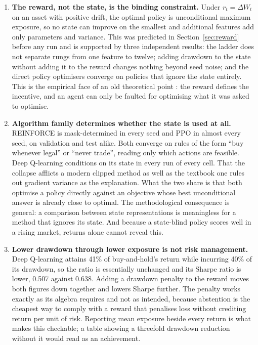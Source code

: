 \begin{enumerate}
  \item \textbf{The reward, not the state, is the binding constraint.}
  Under $r_t = \Delta W_t$ on an asset with positive drift, the optimal
  policy is unconditional maximum exposure, so no state can improve on the
  smallest and additional features add only parameters and variance. This
  was predicted in Section~\ref{sec:reward} before any run and is supported
  by three independent results: the ladder does not separate rungs from one
  feature to twelve; adding drawdown to the state without adding it to the
  reward changes nothing beyond seed noise; and the direct policy optimisers
  converge on policies that ignore the state entirely. This is the empirical
  face of an old theoretical point \cite{moody2001}: the reward defines the
  incentive, and an agent can only be faulted for optimising what it was
  asked to optimise.

  \item \textbf{Algorithm family determines whether the state is used at
  all.} REINFORCE is mask-determined in every seed and PPO in almost every
  seed, on validation and test alike. Both converge on rules of the form
  ``buy whenever legal'' or ``never trade'', reading only which actions are
  feasible. Deep Q-learning conditions on its state in every run of every
  cell. That the collapse afflicts a modern clipped method as well as the
  textbook one rules out gradient variance as the explanation. What the two
  share is that both optimise a policy directly against an objective whose
  best unconditional answer is already close to optimal.
  The methodological consequence is general: a comparison between state
  representations is meaningless for a method that ignores its state. And
  because a state-blind policy scores well in a rising market, returns alone
  cannot reveal this.

  \item \textbf{Lower drawdown through lower exposure is not risk
  management.} Deep Q-learning attains 41\% of buy-and-hold's return while
  incurring 40\% of its drawdown, so the ratio is essentially unchanged and
  its Sharpe ratio is lower, 0.507 against 0.638. Adding a drawdown penalty
  to the reward moves both figures down together and lowers Sharpe further.
  The penalty works exactly as its algebra requires and not as intended,
  because abstention is the cheapest way to comply with a reward that
  penalises loss without crediting return per unit of risk. Reporting mean
  exposure beside every return is what makes this checkable; a table showing
  a threefold drawdown reduction without it would read as an achievement.


\end{enumerate}
